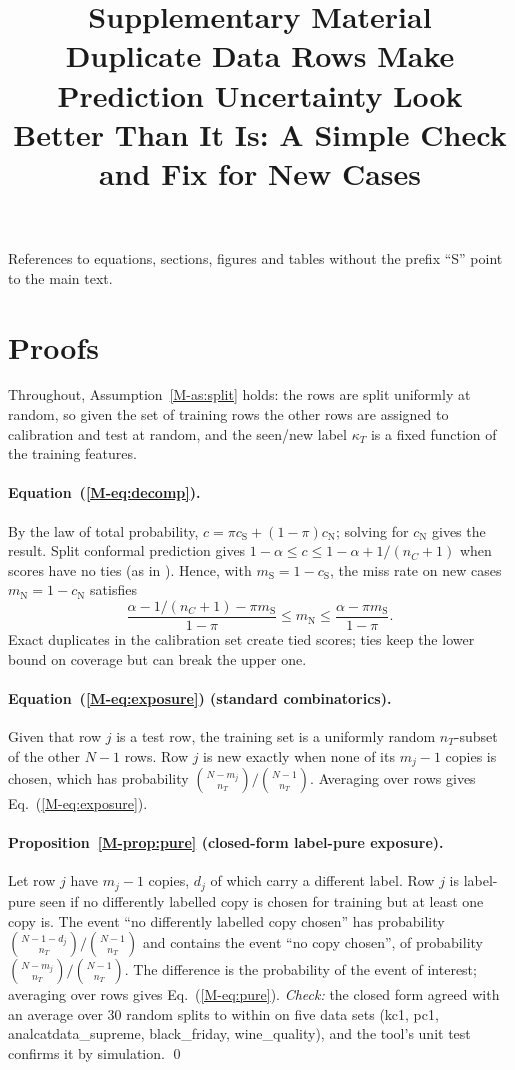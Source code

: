 \documentclass[11pt]{article}
\title{Supplementary Material\\[4pt]\large Duplicate Data Rows Make Prediction Uncertainty Look Better Than It Is: A Simple Check and Fix for New Cases}
\date{}
\begin{document}
\maketitle
\noindent References to equations, sections, figures and tables without the prefix ``S'' point to the main text.
\tableofcontents

\section{Proofs}\label{sec:proofs}
Throughout, Assumption~\ref{M-as:split} holds: the rows are split uniformly at random, so given the set of training rows the other rows are assigned to calibration and test at random, and the seen/new label $\kappa_T$ is a fixed function of the training features.

\paragraph{Equation~(\ref{M-eq:decomp}).} By the law of total probability, $c=\pi c_{\mathrm S}+(1-\pi)c_{\mathrm N}$; solving for $c_{\mathrm N}$ gives the result. Split conformal prediction gives $1-\alpha\le c\le 1-\alpha+1/(n_C+1)$ when scores have no ties (as in \cite{M-lei2018}). Hence, with $m_{\mathrm S}=1-c_{\mathrm S}$, the miss rate on new cases $m_{\mathrm N}=1-c_{\mathrm N}$ satisfies
\begin{equation}
\frac{\alpha-1/(n_C+1)-\pi m_{\mathrm S}}{1-\pi}\le m_{\mathrm N}\le \frac{\alpha-\pi m_{\mathrm S}}{1-\pi}.
\end{equation}
Exact duplicates in the calibration set create tied scores; ties keep the lower bound on coverage but can break the upper one.

\paragraph{Equation~(\ref{M-eq:exposure}) (standard combinatorics).} Given that row $j$ is a test row, the training set is a uniformly random $n_T$-subset of the other $N-1$ rows. Row $j$ is new exactly when none of its $m_j-1$ copies is chosen, which has probability $\binom{N-m_j}{n_T}/\binom{N-1}{n_T}$. Averaging over rows gives Eq.~(\ref{M-eq:exposure}).

\paragraph{Proposition~\ref{M-prop:pure} (closed-form label-pure exposure).} Let row $j$ have $m_j-1$ copies, $d_j$ of which carry a different label. Row $j$ is label-pure seen if no differently labelled copy is chosen for training but at least one copy is. The event ``no differently labelled copy chosen'' has probability $\binom{N-1-d_j}{n_T}/\binom{N-1}{n_T}$ and contains the event ``no copy chosen'', of probability $\binom{N-m_j}{n_T}/\binom{N-1}{n_T}$. The difference is the probability of the event of interest; averaging over rows gives Eq.~(\ref{M-eq:pure}). \emph{Check:} the closed form agreed with an average over 30 random splits to within \NPureCfMaxdiff{} on five data sets (kc1, pc1, analcatdata\_supreme, black\_friday, wine\_quality), and the tool's unit test confirms it by simulation. \qed
\end{document}

